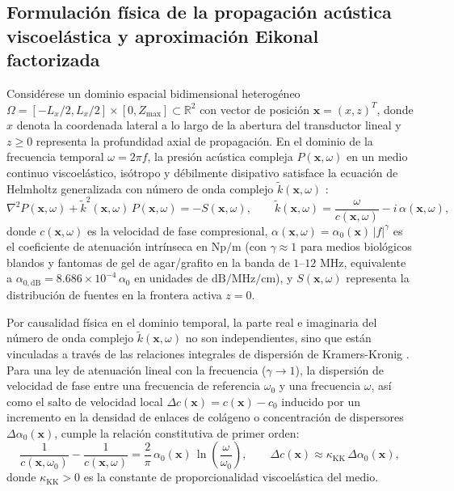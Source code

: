 \documentclass[9pt]{article}
\begin{document}
\subsection{Formulación física de la propagación acústica viscoelástica y aproximación Eikonal factorizada}
\label{subsec:eikonal}

Considérese un dominio espacial bidimensional heterogéneo $\Omega = [-L_x/2, L_x/2] \times [0, Z_{\max}] \subset \mathbb{R}^2$ con vector de posición $\mathbf{x} = (x, z)^T$, donde $x$ denota la coordenada lateral a lo largo de la abertura del transductor lineal y $z \ge 0$ representa la profundidad axial de propagación. En el dominio de la frecuencia temporal $\omega = 2\pi f$, la presión acústica compleja $P(\mathbf{x}, \omega)$ en un medio continuo viscoelástico, isótropo y débilmente disipativo satisface la ecuación de Helmholtz generalizada con número de onda complejo $\tilde{k}(\mathbf{x}, \omega)$ \parencite{Szabo2014, Waters2000}:
\begin{equation}
\nabla^2 P(\mathbf{x}, \omega) + \tilde{k}^2(\mathbf{x}, \omega)\,P(\mathbf{x}, \omega) = -S(\mathbf{x}, \omega), \qquad \tilde{k}(\mathbf{x}, \omega) = \frac{\omega}{c(\mathbf{x}, \omega)} - i\,\alpha(\mathbf{x}, \omega),
\label{eq:helmholtz_visco}
\end{equation}
donde $c(\mathbf{x}, \omega)$ es la velocidad de fase compresional, $\alpha(\mathbf{x}, \omega) = \alpha_0(\mathbf{x})\,\lvert f\rvert^\gamma$ es el coeficiente de atenuación intrínseca en $\text{Np/m}$ (con $\gamma \approx 1$ para medios biológicos blandos y fantomas de gel de agar/grafito en la banda de $1\text{--}12\text{ MHz}$, equivalente a $\alpha_{0,\text{dB}} = 8.686 \times 10^{-4}\,\alpha_0$ en unidades de $\text{dB/MHz/cm}$), y $S(\mathbf{x}, \omega)$ representa la distribución de fuentes en la frontera activa $z = 0$.

Por causalidad física en el dominio temporal, la parte real e imaginaria del número de onda complejo $\tilde{k}(\mathbf{x}, \omega)$ no son independientes, sino que están vinculadas a través de las relaciones integrales de dispersión de Kramers-Kronig \parencite{ODonnell1981, Waters2000}. Para una ley de atenuación lineal con la frecuencia ($\gamma \to 1$), la dispersión de velocidad de fase entre una frecuencia de referencia $\omega_0$ y una frecuencia $\omega$, así como el salto de velocidad local $\Delta c(\mathbf{x}) = c(\mathbf{x}) - c_0$ inducido por un incremento en la densidad de enlaces de colágeno o concentración de dispersores $\Delta\alpha_0(\mathbf{x})$, cumple la relación constitutiva de primer orden:
\begin{equation}
\frac{1}{c(\mathbf{x}, \omega_0)} - \frac{1}{c(\mathbf{x}, \omega)} = \frac{2}{\pi}\,\alpha_0(\mathbf{x})\,\ln\!\left(\frac{\omega}{\omega_0}\right), \qquad \Delta c(\mathbf{x}) \approx \kappa_{\text{KK}}\,\Delta\alpha_0(\mathbf{x}),
\label{eq:kramers_kronig}
\end{equation}
donde $\kappa_{\text{KK}} > 0$ es la constante de proporcionalidad viscoelástica del medio.
\end{document}
